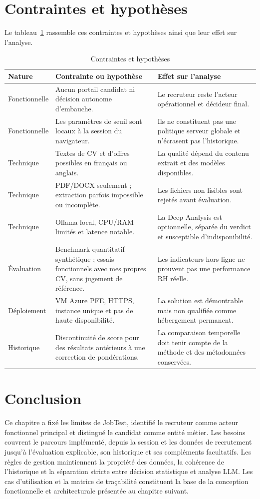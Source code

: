 \section{Contraintes et hypothèses}
Le tableau~\ref{tab:contraintes-jobtest} rassemble ces contraintes et hypothèses ainsi que leur effet sur l'analyse.

\begin{table}[htbp]
\centering\small
\begin{tabularx}{\textwidth}{|p{3.3cm}|p{4.1cm}|X|}
\hline
\textbf{Nature} & \textbf{Contrainte ou hypothèse} & \textbf{Effet sur l'analyse}\\
\hline
Fonctionnelle & Aucun portail candidat ni décision autonome d'embauche. & Le recruteur reste l'acteur opérationnel et décideur final.\\
\hline
Fonctionnelle & Les paramètres de seuil sont locaux à la session du navigateur. & Ils ne constituent pas une politique serveur globale et n'écrasent pas l'historique.\\
\hline
Technique & Textes de CV et d'offres possibles en français ou anglais. & La qualité dépend du contenu extrait et des modèles disponibles.\\
\hline
Technique & PDF/DOCX seulement ; extraction parfois impossible ou incomplète. & Les fichiers non lisibles sont rejetés avant évaluation.\\
\hline
Technique & Ollama local, CPU/RAM limités et latence notable. & La Deep Analysis est optionnelle, séparée du verdict et susceptible d'indisponibilité.\\
\hline
Évaluation & Benchmark quantitatif synthétique ; essais fonctionnels avec mes propres CV, sans jugement de référence. & Les indicateurs hors ligne ne prouvent pas une performance RH réelle.\\
\hline
Déploiement & VM Azure PFE, HTTPS, instance unique et pas de haute disponibilité. & La solution est démontrable mais non qualifiée comme hébergement permanent.\\
\hline
Historique & Discontinuité de score pour des résultats antérieurs à une correction de pondérations. & La comparaison temporelle doit tenir compte de la méthode et des métadonnées conservées.\\
\hline
\end{tabularx}
\caption{Contraintes et hypothèses}
\label{tab:contraintes-jobtest}
\end{table}

\section*{Conclusion}
Ce chapitre a fixé les limites de JobTest, identifié le recruteur comme acteur fonctionnel principal et distingué le candidat comme entité métier. Les besoins couvrent le parcours implémenté, depuis la session et les données de recrutement jusqu'à l'évaluation explicable, son historique et ses compléments facultatifs. Les règles de gestion maintiennent la propriété des données, la cohérence de l'historique et la séparation stricte entre décision statistique et analyse LLM. Les cas d'utilisation et la matrice de traçabilité constituent la base de la conception fonctionnelle et architecturale présentée au chapitre suivant.
